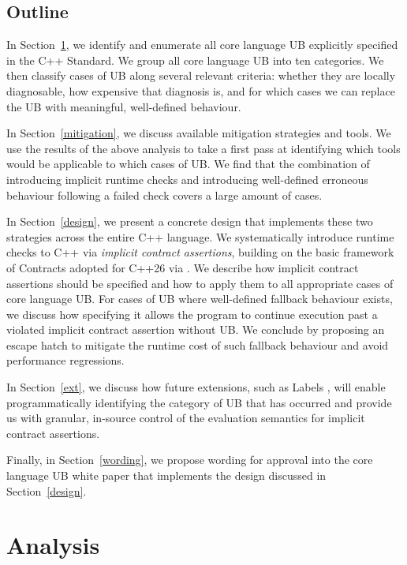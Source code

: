 \subsection{Outline}

In Section~\ref{analysis}, we identify and enumerate all core language UB explicitly specified in the C++ Standard. We group all core language UB into ten categories. We then classify cases of UB along several relevant criteria: whether they are locally diagnosable, how expensive that diagnosis is, and for which cases we can replace the UB with meaningful, well-defined behaviour.

In Section~\ref{mitigation}, we discuss available mitigation strategies and tools. We use the results of the above analysis to take a first pass at identifying which tools would be applicable to which cases of UB. We find that the combination of introducing implicit runtime checks and introducing well-defined erroneous behaviour following a failed check covers a large amount of cases.

In Section~\ref{design}, we present a concrete design that implements these two strategies across the entire C++ language. We systematically introduce runtime checks to C++ via  \emph{implicit contract assertions}, building on the basic framework of Contracts adopted for C++26 via \cite{P2900R14}. We describe how implicit contract assertions should be specified and how to apply them to all appropriate cases of core language UB. For cases of UB where well-defined fallback behaviour exists, we discuss how specifying it allows the program to continue execution past a violated implicit contract assertion without UB. We conclude by proposing an escape hatch to mitigate the runtime cost of such fallback behaviour and avoid performance regressions.

In Section~\ref{ext}, we discuss how future extensions, such as Labels \cite{P3400R1},
will enable programmatically identifying the category of UB that has occurred and provide us with granular, in-source control of the evaluation semantics for implicit contract assertions.

Finally, in Section~\ref{wording}, we propose wording for approval into the core language UB white paper \cite{P3656R1} that implements the design discussed in Section~\ref{design}.

\section{Analysis}
\label{analysis}

